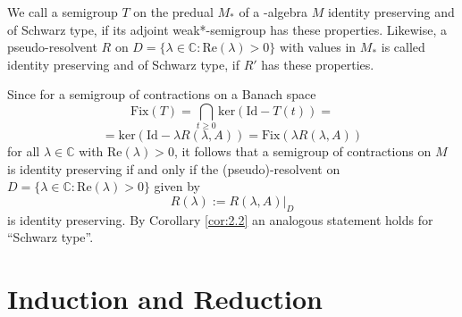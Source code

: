 \begin{definition}\label{def:2.4}
We call a semigroup $ T $ on the predual $ M_{*} $ of a \WA-algebra $ M $ identity preserving and of Schwarz type, if its adjoint weak*-semigroup has these properties.
Likewise, a pseudo-resolvent $ R $ on $ D = \{\lambda \in \mathbb{C} : \text{Re}(\lambda) > 0\} $ with values in $ M_{*} $ is called identity preserving and of Schwarz type, if $ R' $ has these properties.
\end{definition}

Since for a semigroup of contractions on a Banach space
\[
\text{Fix}(T) = \bigcap_{t \geq 0} \text{ker}(\text{Id} - T(t)) =
\]
\[
= \text{ker}(\text{Id} - \lambda R(\lambda,A)) = \text{Fix}(\lambda R(\lambda,A))
\]
for all $ \lambda \in \mathbb{C} $ with $ \text{Re}(\lambda) > 0 $, it follows that a semigroup of contractions on $ M $ is identity preserving if and only if the (pseudo)-resolvent on $ D = \{\lambda \in \mathbb{C} : \text{Re}(\lambda) > 0\} $ given by
\[
R(\lambda) := R(\lambda,A)|_D
\]
is identity preserving.
By Corollary \ref{cor:2.2} an analogous statement holds for \enquote{Schwarz type}.


\section{Induction and Reduction}

